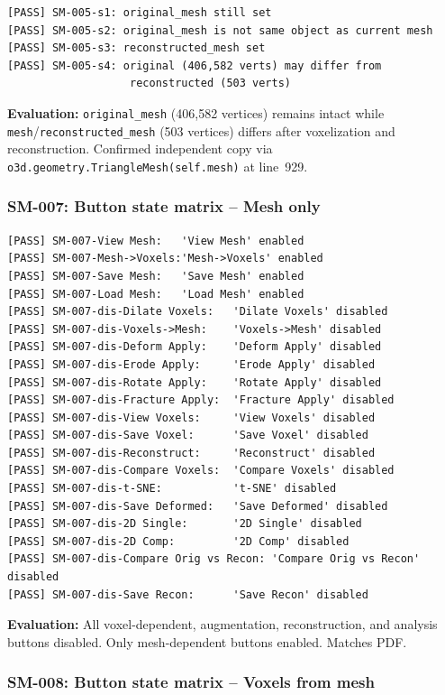 \documentclass[12pt,a4paper]{article}
\begin{document}
\begin{lstlisting}
[PASS] SM-005-s1: original_mesh still set
[PASS] SM-005-s2: original_mesh is not same object as current mesh
[PASS] SM-005-s3: reconstructed_mesh set
[PASS] SM-005-s4: original (406,582 verts) may differ from
                   reconstructed (503 verts)
\end{lstlisting}

\textbf{Evaluation:} \texttt{original\_mesh} (406,582 vertices) remains intact
while \texttt{mesh}/\texttt{reconstructed\_mesh} (503 vertices) differs after
voxelization and reconstruction. Confirmed independent copy via
\texttt{o3d.geometry.TriangleMesh(self.mesh)} at line~929.

\subsubsection{SM-007: Button state matrix -- Mesh only}

\begin{lstlisting}
[PASS] SM-007-View Mesh:   'View Mesh' enabled
[PASS] SM-007-Mesh->Voxels:'Mesh->Voxels' enabled
[PASS] SM-007-Save Mesh:   'Save Mesh' enabled
[PASS] SM-007-Load Mesh:   'Load Mesh' enabled
[PASS] SM-007-dis-Dilate Voxels:   'Dilate Voxels' disabled
[PASS] SM-007-dis-Voxels->Mesh:    'Voxels->Mesh' disabled
[PASS] SM-007-dis-Deform Apply:    'Deform Apply' disabled
[PASS] SM-007-dis-Erode Apply:     'Erode Apply' disabled
[PASS] SM-007-dis-Rotate Apply:    'Rotate Apply' disabled
[PASS] SM-007-dis-Fracture Apply:  'Fracture Apply' disabled
[PASS] SM-007-dis-View Voxels:     'View Voxels' disabled
[PASS] SM-007-dis-Save Voxel:      'Save Voxel' disabled
[PASS] SM-007-dis-Reconstruct:     'Reconstruct' disabled
[PASS] SM-007-dis-Compare Voxels:  'Compare Voxels' disabled
[PASS] SM-007-dis-t-SNE:           't-SNE' disabled
[PASS] SM-007-dis-Save Deformed:   'Save Deformed' disabled
[PASS] SM-007-dis-2D Single:       '2D Single' disabled
[PASS] SM-007-dis-2D Comp:         '2D Comp' disabled
[PASS] SM-007-dis-Compare Orig vs Recon: 'Compare Orig vs Recon' disabled
[PASS] SM-007-dis-Save Recon:      'Save Recon' disabled
\end{lstlisting}

\textbf{Evaluation:} All voxel-dependent, augmentation, reconstruction, and
analysis buttons disabled. Only mesh-dependent buttons enabled. Matches PDF.

\subsubsection{SM-008: Button state matrix -- Voxels from mesh}
\end{document}
